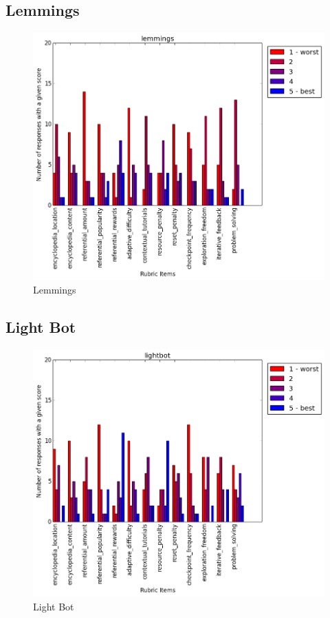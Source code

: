 			\subsection{Lemmings}

				\begin{figure}[] 
				\centering 
				\includegraphics[width=\textwidth, height=.4\textheight, keepaspectratio=true]{lemmings_scores.png} 
				\caption{Lemmings}
				\end{figure}

			\subsection{Light Bot}

				\begin{figure}[] 
				\centering 
				\includegraphics[width=\textwidth, height=.4\textheight, keepaspectratio=true]{lightbot_scores.png} 
				\caption{Light Bot}
				\end{figure}

